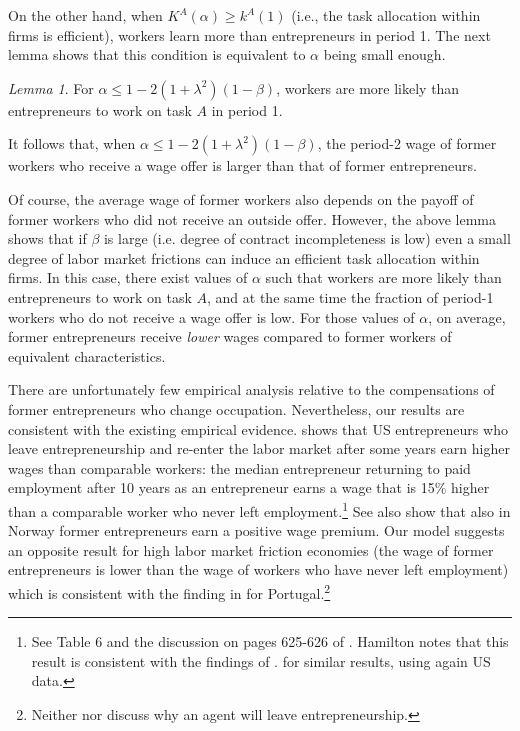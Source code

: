 \documentclass[12pt,american]{paper}
\theoremstyle{remark}
\newtheorem{lemma}{Lemma}
\begin{document}
On the other hand, when $K^A(\alpha)\geq k^A(1)$ (i.e., the task allocation within firms is efficient), workers learn more than entrepreneurs in period 1. The next lemma shows that this condition is equivalent to $\alpha$ being small enough.
\begin{lemma}\label{wages-general-model}
For $\alpha\leq 1- 2(1+\lambda^2)(1-\beta)$, workers are more likely than entrepreneurs to work on task $A$ in period 1.
\end{lemma}%
\noindent 
It follows that, when $\alpha\leq 1- 2(1+\lambda^2)(1-\beta)$, the period-2 wage of former workers who receive a wage offer is larger than that of former entrepreneurs.

Of course, the average wage of former workers also depends on the payoff of former workers who did not receive an outside offer. However, the above lemma shows that if $\beta$ is large (i.e. degree of contract incompleteness is low) even a small degree of labor market frictions can induce an efficient task allocation within firms. In this case, there exist values of $\alpha$ such that workers are more likely than entrepreneurs to work on task $A$, and at the same time the fraction of period-1 workers who do not receive a wage offer is low. For those values of $\alpha$, on average, former entrepreneurs  receive \textit{lower} wages compared to former workers of equivalent characteristics.
% 

There are unfortunately few empirical analysis relative to the compensations of former entrepreneurs who change occupation.  Nevertheless, our results are consistent with the existing empirical evidence. \citet{hamilton2000does} shows that US entrepreneurs who leave entrepreneurship and re-enter the labor market after some years earn higher wages than comparable workers: the median entrepreneur returning to paid employment after 10 years as an entrepreneur earns a wage that is 15\% higher than a comparable worker who never left employment.\footnote{%
See Table 6 and the discussion on pages 625-626 of \cite{hamilton2000does}. Hamilton notes that this result is consistent with the findings of \cite{evans1990}.   \cite{daly2015long} for similar results, using again US data.} See also \cite{luzzi2016individual} show that also in Norway former entrepreneurs earn a positive wage premium.  Our model suggests an opposite result for high labor market friction economies (the wage of former entrepreneurs is lower than the wage of workers who have never left employment) which is consistent with the finding in \citet*{baptista2012former} for Portugal.\footnote{Neither \citet{hamilton2000does} nor \citet*{baptista2012former} discuss why an agent will leave entrepreneurship.}
\end{document}
